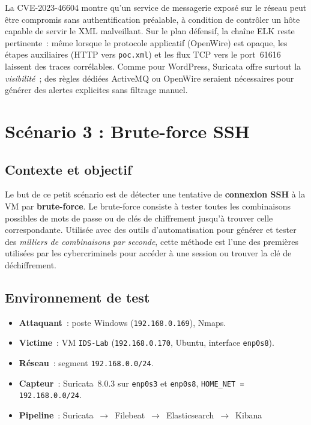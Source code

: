 \documentclass[12pt]{article}
\begin{document}
La CVE-2023-46604 montre qu'un service de messagerie exposé sur le réseau peut
être compromis sans authentification préalable, à condition de contrôler un
hôte capable de servir le XML malveillant. Sur le plan défensif, la chaîne
ELK reste pertinente~: même lorsque le protocole applicatif (OpenWire) est
opaque, les étapes auxiliaires (HTTP vers \texttt{poc.xml}) et les flux TCP
vers le port~61616 laissent des traces corrélables. Comme pour WordPress,
Suricata offre surtout la \textit{visibilité}~; des règles dédiées ActiveMQ
ou OpenWire seraient nécessaires pour générer des alertes explicites sans
filtrage manuel.


\section{Scénario 3 : Brute-force SSH}\label{sec:Q4} 

\subsection{Contexte et objectif}

Le but de ce petit scénario est de détecter une tentative de \textbf{connexion SSH} à la VM par \textbf{brute-force}. Le brute-force consiste à tester toutes les combinaisons possibles de mots de passe ou de clés de chiffrement jusqu'à trouver celle correspondante. Utilisée avec des outils d'automatisation pour générer et tester des \textit{milliers de combinaisons par seconde}, cette méthode est l'une des premières utilisées par les cybercriminels pour accéder à une session ou trouver la clé de déchiffrement.


\subsection{Environnement de test}

\begin{itemize}[nosep]
  \item \textbf{Attaquant}~: poste Windows (\texttt{192.168.0.169}), Nmaps.
  \item \textbf{Victime}~: VM \texttt{IDS-Lab} (\texttt{192.168.0.170},
        Ubuntu, interface \texttt{enp0s8}).
  \item \textbf{Réseau}~: segment \texttt{192.168.0.0/24}.
  \item \textbf{Capteur}~: Suricata~8.0.3 sur \texttt{enp0s3} et \texttt{enp0s8}, \texttt{HOME\_NET = 192.168.0.0/24}.
  \item \textbf{Pipeline}~: Suricata~$\rightarrow$~Filebeat~$\rightarrow$~Elasticsearch~$\rightarrow$~Kibana
\end{itemize}
\end{document}
